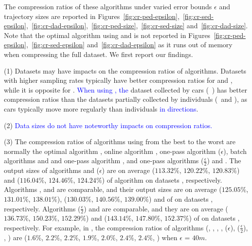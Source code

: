 The compression ratios of these algorithms under varied error bounds $\epsilon$ and trajectory sizes are reported in Figures~\ref{fig:cr-ped-epsilon},~\ref{fig:cr-sed-epsilon},~\ref{fig:cr-dad-epsilon},~\ref{fig:cr-ped-size},~\ref{fig:cr-sed-size} and~\ref{fig:cr-dad-size}.
{Note that the optimal algorithm using \sed and \dad is not reported in Figures~\ref{fig:cr-ped-epsilon},~\ref{fig:cr-sed-epsilon} and~\ref{fig:cr-dad-epsilon} as it runs out of memory when compressing the full dataset}. We first report our findings.


\sstab(1)  {Datasets may have impacts on the compression ratios of \lsa algorithms. Datasets with higher sampling rates typically have better compression ratios for \ped and \sed, while it is opposite for \dad. \textcolor{blue}{When using \dad, the} dataset collected by cars (\eg~\ucar) has better compression ratios than the datasets partially collected by individuals (\eg~\geolife and \mopsi), as cars typically move more regularly than individuals \textcolor{blue}{in directions}. }

\sstab(2) \textcolor{blue}{Data sizes do not have noteworthy impacts on compression ratios.}

\sstab(3) The compression ratios of algorithms using \ped from the best
to the worst are normally the optimal algorithm \opt, online algorithm \bqsa, one-pass algorithm \siped($\epsilon$), batch algorithms \tpa and \dpa and one-pass algorithm , and one-pass algorithms \siped($\frac{\epsilon}{2}$) and \operb.
The output sizes of algorithms \bqsa and \siped({$\epsilon$}) are on average
($113.32\%$, $120.22\%$, $120.83\%$) and ($116.04\%$, $124.46\%$, $124.24\%$) of algorithm \opt
on datasets \dSets, respectively.
Algorithms \tpa, \dpa and  are comparable, and their output sizes are on average
($125.05\%$, $131.01\%$, $138.01\%$), ($130.03\%$, $140.56\%$, $139.00\%$) and  of \opt
on datasets \dSets, respectively.
Algorithms \siped($\frac{\epsilon}{2}$) and \operb are comparable, and they are on average
($136.73\%$, $150.23\%$, $152.29\%$) and ($143.14\%$, $147.80\%$, $152.37\%$) of \opt on datasets \dSets, respectively.
%
For example, in \mopsi, the compression ratios of algorithms
(\opt, \tpa, \dpa, \bqsa, \siped(${\epsilon}$), \siped($\frac{\epsilon}{2}$), \operb,  ) are ($1.6\%$, $2.2\%$, $2.2\%$, $1.9\%$, $2.0\%$, $2.4\%$, $2.4\%$, ) when $\epsilon$ = $40m$.
%



